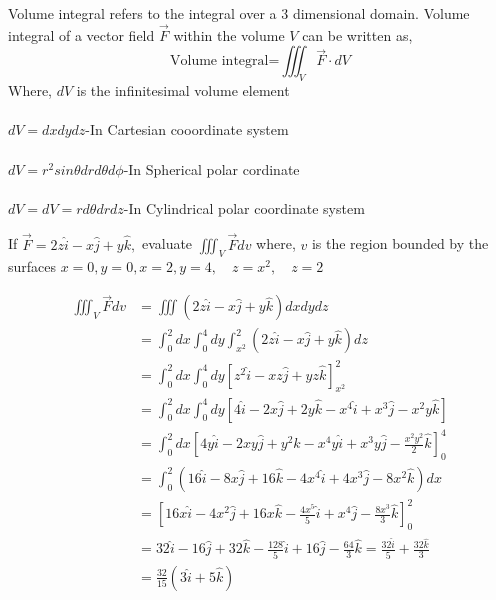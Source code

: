 Volume integral refers to the integral over a 3 dimensional domain.
Volume integral of a vector field $\vec{F}$ within the volume $V$ can be written as,
$$\text{Volume integral=}\iiint_{V} \vec{F} \cdot dV$$ Where, $d V$ is the infinitesimal volume element\\\\
$dV= dx dy dz$\hspace{2.2cm}-In Cartesian cooordinate system\\\\
$dV= r^{2} sin\theta dr d\theta d\phi$\hspace{0.9cm}-In Spherical polar cordinate \\\\
$dV= d V=r d \theta d r d z$\hspace{0.9cm}-In Cylindrical polar coordinate system
\begin{exercise}
	 If $\vec{F}=2 z \hat{i}-x \hat{j}+y \hat{k},$ evaluate $\iiint_{V} \vec{F} d v$ where, $v$ is the region bounded by
	the surfaces $x=0, y=0, x=2, y=4, \quad z=x^{2}, \quad z=2$\end{exercise}
	\begin{answer}
			
		\begin{align*}
			\iiint_{V} \vec{F} d v&=\iiint(2 z \hat{i}-x \hat{j}+y \hat{k}) d x d y d z \\
			&=\int_{0}^{2} d x \int_{0}^{4} d y \int_{x^{2}}^{2}(2 z \hat{i}-x \hat{j}+y \hat{k}) d z\\&=\int_{0}^{2} d x \int_{0}^{4} d y\left[z^{2} \hat{i}-x z \hat{j}+y z \hat{k}\right]_{x^{2}}^{2} \\
			&=\int_{0}^{2} d x \int_{0}^{4} d y\left[4 \hat{i}-2 x \hat{j}+2 y \hat{k}-x^{4} \hat{i}+x^{3} \hat{j}-x^{2} y \hat{k}\right] \\
			&=\int_{0}^{2} d x\left[4 y \hat{i}-2 x y \hat{j}+y^{2} \hat{k}-x^{4} y \hat{i}+x^{3} y \hat{j}-\frac{x^{2} y^{2}}{2} \hat{k}\right]_{0}^{4}\\&=\int_{0}^{2}\left(16 \hat{i}-8 x \hat{j}+16 \hat{k}-4 x^{4} \hat{i}+4 x^{3} \hat{j}-8 x^{2} \hat{k}\right) d x \\
			&=\left[16 x \hat{i}-4 x^{2} \hat{j}+16 x \hat{k}-\frac{4 x^{5}}{5} \hat{i}+x^{4} \hat{j}-\frac{8 x^{3}}{3} \hat{k}\right]_{0}^{2} \\
			&=32 \hat{i}-16 \hat{j}+32 \hat{k}-\frac{128}{5} \hat{i}+16 \hat{j}-\frac{64}{3} \hat{k}=\frac{32 \hat{i}}{5}+\frac{32 \hat{k}}{3}\\&=\frac{32}{15}(3 \hat{i}+5 \hat{k})
		\end{align*}
	
		
	\end{answer}


